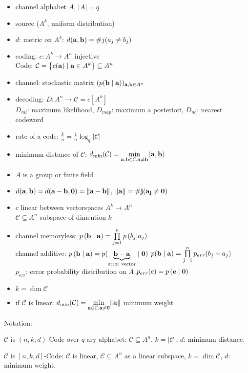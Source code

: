 \documentclass[a4paper]{scrartcl}
\theoremstyle{plain}
\theoremstyle{definition}
\theoremstyle{examplestyle}
\newcommand\coding{\ensuremath{\mathcal C}\xspace}
\newcommand{\vect}[1]{\ensuremath{\bf #1}\xspace}
\begin{document}
\begin{minipage}[t]{0.5\textwidth}\raggedright
  \begin{itemize}
     \item channel alphabet $A$, $\left|A\right| = q$ 
    \item  source ($A^k$, uniform distribution) 
      \item  $d$: metric on $A^k$: $d({\vect a}, {\vect b}) = \#j(a_j\neq b_j)$ 
      \item  coding: $c:A^k \rightarrow A^n$ injective\\
       Code: $\mathcal C = \left\{ c({\vect a}) \mid {\vect a}\in A^k \right\}
          \subseteq A^n$ 
          \item  channel: stochastic matrix $(p({\vect b}\mid{\vect a}))_{ {\vect a},{\vect
            b}\in A^n }$ 
      \item  decoding: $D:A^n \rightarrow \coding = c[A^k]$ \\
      $D_{ml}$: maximum likelihood, 
      $D_{map}$: maximum a posteriori,
      $D_{nc}$: nearest codeword
    \item rate of a code: $\frac{k}{n}=\frac{1}{n}\log_q \vert\coding\vert$
    \item minimum distance of \coding: $d_{\min}(\coding) = \underset{\vect a,\vect
      b\in\coding,\vect a \neq\vect b}{\min}(\vect a,\vect b)$
  \end{itemize}
\end{minipage}\hfill\noindent
\begin{minipage}[t]{0.5\textwidth}\raggedright
\begin{itemize}
  \item $A$ is a group or finite field

  \item $d({\vect a}, {\vect b}) = d({\vect a}-{\vect b}, {\vect 0}) = \|{\vect a} - {\vect
    b}\|$, $\|\vect a\| = \#j(a_j \neq 0)$
  \item $c$ linear between vectorspaces $A^k\rightarrow A^n$\\
   $\mathcal C\subseteq A^n$ subspace of dimention $k$
  \item channel memoryless: $p\left( {\vect b}\mid{\vect a} \right) =
        \prod\limits_{j=1}^n p\left( b_j | a_j \right)$\\
      channel additive: $p\left( {\vect b}\mid{\vect a} \right) = p( \underbrace{{\vect
        b}-{\vect a}}_{\text{error vector}}\mid {\vect 0} )$
  $p({\vect b}\mid{\vect a}) = \prod\limits_{j=1}^n p_{err}(b_j - a_j)$\\
  $p_{err}$: error probability distribution on $A$ 
  $p_{err}(e) = p\left( \vect e \mid \vect 0 \right)$
  \item $k = \dim \coding$
  \item if \coding is linear: $d_{\min}(\coding) = \underset{\vect a \in \coding, \vect a \neq
    \vect 0}{\min} \Vert
    \vect a \Vert$ minimum weight
\end{itemize}
\end{minipage}

Notation:

\coding is $(n, k, d)$-Code over $q$-ary alphabet: $\coding\subseteq A^n$,
$k=\vert\coding\vert$, $d$: minimum distance.

\coding is $\left[ n,k,d \right]$-Code: \coding is linear, $\coding\subseteq A^n$ as a linear
subspace, $k=\dim\coding$, $d$: minimum weight.
\end{document}
